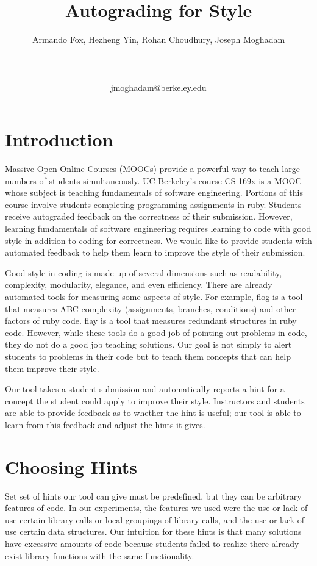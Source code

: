 \documentclass[11pt]{article}
\title{Autograding for Style}
\author{Armando Fox, Hezheng Yin, Rohan Choudhury, Joseph Moghadam \\
   \\
   \\
   \\
  {jmoghadam@berkeley.edu} \\}
\date{}
\begin{document}
\maketitle
\begin{abstract}

\end{abstract}

\section{Introduction}

Massive Open Online Courses (MOOCs) provide a powerful way to teach large numbers of students simultaneously. UC Berkeley's course CS 169x is a MOOC whose subject is teaching fundamentals of software engineering. Portions of this course involve students completing programming assignments in ruby. Students receive autograded feedback on the correctness of their submission. However, learning fundamentals of software engineering requires learning to code with good style in addition to coding for correctness. We would like to provide students with automated feedback to help them learn to improve the style of their submission. 

Good style in coding is made up of several dimensions such as readability, complexity, modularity, elegance, and even efficiency. There are already automated tools for measuring some aspects of style. For example, flog is a tool that measures ABC complexity (assignments, branches, conditions) and other factors of ruby code. flay is a tool that measures redundant structures in ruby code. However, while these tools do a good job of pointing out problems in code, they do not do a good job teaching solutions. Our goal is not simply to alert students to problems in their code but to teach them concepts that can help them improve their style.

Our tool takes a student submission and automatically reports a hint for a concept the student could apply to improve their style. Instructors and students are able to provide feedback as to whether the hint is useful; our tool is able to learn from this feedback and adjust the hints it gives.

\section{Choosing Hints}

Set set of hints our tool can give must be predefined, but they can be arbitrary features of code. In our experiments, the features we used were the use or lack of use certain library calls or local groupings of library calls, and the use or lack of use certain data structures. Our intuition for these hints is that many solutions have excessive amounts of code because students failed to realize there already exist library functions with the same functionality.
\end{document}
